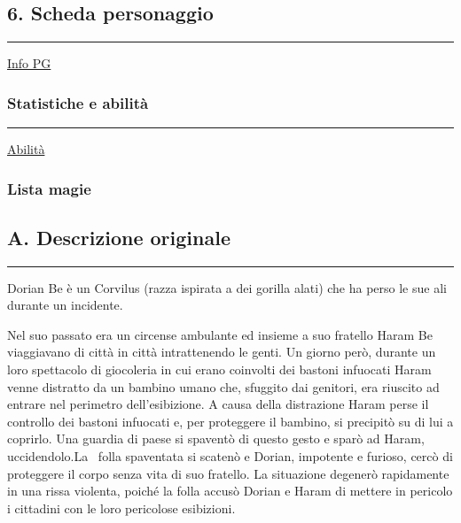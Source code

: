 \subsection{6. Scheda personaggio}\label{scheda-personaggio}

\begin{center}\rule{0.5\linewidth}{0.5pt}\end{center}

\href{Info\%20PG\%20c9e8f3e9edd64ec483415e8d3d705fc1.csv}{Info PG}

\subsubsection{Statistiche e abilità}\label{statistiche-e-abilituxe0}

\begin{center}\rule{0.5\linewidth}{0.5pt}\end{center}

\href{Abilita\%CC\%80\%207a1791510d12420c97f76cd664f79f50.csv}{Abilità}

\subsubsection{Lista magie}\label{lista-magie}

\subsection{A. Descrizione originale}\label{a.-descrizione-originale}

\begin{center}\rule{0.5\linewidth}{0.5pt}\end{center}

Dorian Be è un Corvilus (razza ispirata a dei gorilla alati) che ha
perso le sue ali durante un incidente.

Nel suo passato era un circense ambulante ed insieme a suo fratello
Haram Be viaggiavano di città in città intrattenendo le genti. Un giorno
però, durante un loro spettacolo di giocoleria in cui erano coinvolti
dei bastoni infuocati Haram venne distratto da un bambino umano che,
sfuggito dai genitori, era riuscito ad entrare nel perimetro
dell'esibizione. A causa della distrazione Haram perse il controllo dei
bastoni infuocati e, per proteggere il bambino, si precipitò su di lui a
coprirlo. Una guardia di paese si spaventò di questo gesto e sparò ad
Haram, uccidendolo.La~ folla spaventata si scatenò e Dorian, impotente e
furioso, cercò di proteggere il corpo senza vita di suo fratello. La
situazione degenerò rapidamente in una rissa violenta, poiché la folla
accusò Dorian e Haram di mettere in pericolo i cittadini con le loro
pericolose esibizioni.

